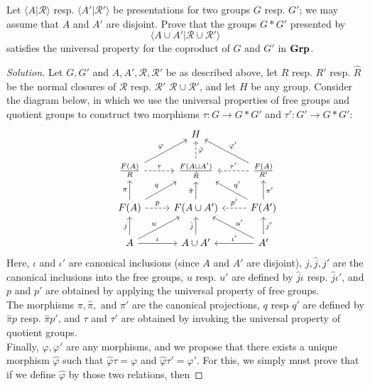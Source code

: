 \documentclass[12pt]{article}
\newenvironment{problem}[2][Problem]{\begin{trivlist}
\item[\hskip \labelsep {\bfseries #1}\hskip \labelsep {\bfseries #2.}]}{\end{trivlist}}
\newcommand{\catname}[1]{\normalfont\textbf{#1}}
\newenvironment{solution}
  {\renewcommand\qedsymbol{$\blacksquare$}\begin{proof}[Solution]}
{\end{proof}}
\theoremstyle{remark}
\begin{document}
\begin{problem}{8.7}
  Let $\langle A|\mathscr{R}\rangle$ resp. $\langle A'|\mathscr{R}'\rangle$ be presentations for two groups
  $G$ resp. $G'$; we may assume that $A$ and $A'$ are disjoint.
  Prove that the groups $G*G'$ presented by $$\langle A\cup A' | \mathscr{R}\cup\mathscr{R}'\rangle$$
  satisfies the universal property for the coproduct of $G$ and $G'$ in $\catname{Grp}$.
\end{problem}
\begin{solution}
  Let $G, G'$ and $A,A',\mathscr{R},\mathscr{R'}$ be as described above, let
  $R$ resp. $R'$ resp. $\hat{R}$ be the normal closures of 
  $\mathscr{R}$ resp. $\mathscr{R}'$ $\mathscr{R\cup R'}$, and let $H$ be any group.
  Consider the diagram below, in which we use the universal properties of free groups and
  quotient groups to construct two morphisms $\tau: G\to G*G'$ and $\tau':G'\to G*G'$:
  \[\begin{tikzcd}
    & & H & \\
    & \frac{F(A)}{R} \ar{ur}{\varphi} \ar[dashed]{r}{\tau}
    & \frac{F(A\cup A')}{\hat{R}} \ar[dashed]{u}[swap]{\hat{\varphi}}
    & \frac{F(A)}{R'} \ar{ul}[swap]{\varphi'} \ar[dashed]{l}[swap]{\tau'} \\
    & F(A) \ar{u}{\pi} \ar{ur}{q} \ar[dashed]{r}{p}
    & F(A\cup A') \ar{u}{\hat{\pi}}
    & F(A') \ar{u}[swap]{\pi'} \ar{ul}[swap]{q'} \ar[dashed]{l}[swap]{p'} \\
    & A \ar{u}{j} \ar{ur}{u} \ar{r}{\iota} 
    & A\cup A' \ar{u}{\hat{j}}
    & A' \ar{u}[swap]{j'} \ar{ul}[swap]{u'} \ar{l}[swap]{\iota'} 
  \end{tikzcd}\]
  Here, $\iota$ and $\iota'$ are canonical inclusions (since $A$ and $A'$ are disjoint), 
  $j,\hat{j},j'$ are the canonical inclusions into the free groups, $u$ resp. $u'$ are defined by
  $\hat{j}\iota$ resp. $\hat{j}\iota'$, and $p$ and $p'$ are obtained by applying the universal property
  of free groups. \\
  The morphisms $\pi, \hat\pi,$ and $\pi'$ are the canonical projections, $q$ resp $q'$ are defined by
  $\hat\pi p$ resp. $\hat\pi p'$, and $\tau$ and $\tau'$ are obtained by invoking the universal property
  of quotient groups. \\
  Finally, $\varphi,\varphi'$ are any morphisms, and we propose that there exists a unique morphism
  $\hat\varphi$ such that $\hat\varphi\tau=\varphi$ and $\hat\varphi\tau' = \varphi'$.
  For this, we simply must prove that if we define $\hat\varphi$ by those two relations, then

\end{solution}
\end{document}
